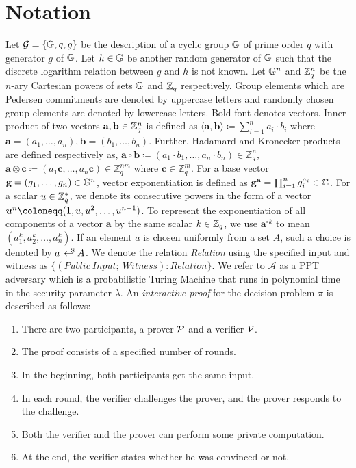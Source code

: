 \section{Notation}
\label{scn:notation}
Let $\mathcal{G} = \{ \G, q, g \}$ be the description of a cyclic group $\G$ of prime order $q$ with generator $g$ of $\G$. Let $h\in \G$ be another random generator of $\G$ such that the discrete logarithm relation between $g$ and $h$ is not known. Let
$\G^n$ and $\Z^n_q$ be the $n$-ary Cartesian powers of sets $\G$ and $\Z_q$ respectively.
Group elements which are Pedersen commitments are denoted by uppercase letters and randomly chosen group elements are denoted by lowercase letters.
Bold font denotes vectors.
Inner product of two vectors $\textbf{a}, \textbf{b} \in \Z_q^n$ is defined as $\langle \textbf{a},\textbf{b} \rangle \coloneqq \sum_{i=1}^{n} a_i \cdot b_i$ where $\textbf{a}=(a_1,\dots, a_n), \textbf{b}=(b_1,\dots,b_n)$. Further, Hadamard and Kronecker products are defined respectively as, $\textbf{a} \circ \textbf{b} \coloneqq (a_1 \cdot b_1, \dots, a_n \cdot b_n) \in \mathbb{Z}_q^n$, $\textbf{a} \otimes \textbf{c} \coloneqq (a_1 \textbf{c}, \dots, a_n \textbf{c}) \in \mathbb{Z}_q^{nm}$ where $\textbf{c} \in \mathbb{Z}_q^m$. For a base vector $\textbf{g} = (g_1, \dots, g_n) \in \G^n$, vector exponentiation is defined as $\textbf{g}^{\textbf{a}} = \prod_{i=1}^{n}g_i^{a_i} \in \G$. For a scalar $u \in \Z_q^{\ast}$, we denote its consecutive powers in the form of a vector $\vecnb{u}^{n} \coloneqq (1, u, u^2, \dots, u^{n-1})$.
To represent the exponentiation of all components of a vector $\textbf{a}$ by the same scalar $k \in \Z_q$, we use $\textbf{a}^{\circ k}$ to mean $(a_1^k, a_2^k, \ldots,a_n^{k})$.
If an element $a$ is chosen uniformly from a set $A$, such a choice is denoted by $a \rgen A$.
We denote the relation \emph{Relation} using the specified input and witness as $\{ (Public \ Input; \ Witness): Relation \}$.
We refer to $\mathcal{A}$ as a \textsf{PPT} adversary which is a probabilistic Turing Machine that runs in polynomial time in the security parameter $\lambda$.
An \emph{interactive proof} for the decision problem $\pi$ is described as follows:
\begin{enumerate}
    \item There are two participants, a prover $\P$ and a verifier $\V$.
    \item The proof consists of a specified number of rounds.
    \item In the beginning, both participants get the same input.
    \item In each round, the verifier challenges the prover, and the prover responds
    to the challenge.
    \item Both the verifier and the prover can perform some private computation.
    \item At the end, the verifier states whether he was convinced or not.
\end{enumerate}


